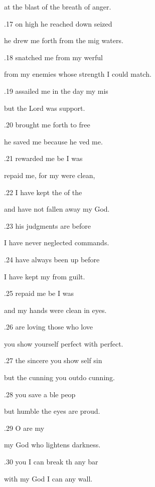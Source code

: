 at the blast of the breath of  anger. 

.17  on high he reached down  seized  

he drew me forth from the mig waters. 

.18  snatched me from my werful  

from my enemies whose strength I could  match. 

.19  assailed me in the day  my mis 

but the Lord was  support. 

.20  brought me forth to free 

he saved me because he ved me. 

.21  rewarded me be I was  

repaid me, for my  were clean, 

.22  I have kept the  of the  

and have not fallen away  my God. 

.23  his judgments are  before  

I have never neglected  commands. 

.24  have always been up before  

I have kept my from guilt. 

.25  repaid me be I was  

and my hands were clean in  eyes. 

.26  are loving  those who love  

you show yourself perfect with  perfect. 

.27  the sincere you show self sin 

but the cunning you outdo  cunning. 

.28  you save a ble peop 

but humble the eyes  are proud. 

.29  O  are my  

my God who lightens  darkness. 

.30  you I can break th any bar 

with my God I can  any wall. 

